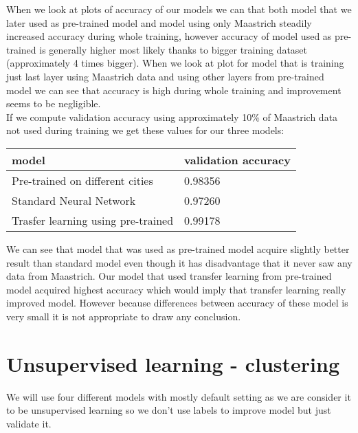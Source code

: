 \documentclass[a4paper]{article}
\begin{document}
	When we look at plots of accuracy of our models we can that both model that we later used as pre-trained model and model using only Maastrich steadily increased accuracy during whole training, however accuracy of model used as pre-trained is generally higher most likely thanks to bigger training dataset (approximately 4 times bigger). When we look at plot for model that is training just last layer using Maastrich data and using other layers from pre-trained model we can see that accuracy is high during whole training and improvement seems to be negligible.   
	\\
	
	If we compute validation accuracy using approximately 10\% of Maastrich data not used during training we get these values for our three models:
	\begin{table}[!h]
		\begin{tabular}{|l|l|}
			\hline
			model &  validation accuracy  \\ \hline
			Pre-trained on different cities  & 0.98356 \\ \hline
			Standard Neural Network & 0.97260 \\ \hline
			Trasfer learning using pre-trained &  0.99178 \\ \hline
		\end{tabular}
	\end{table} 

	We can see that model that was used as pre-trained model acquire slightly better result than standard model even though it has disadvantage that it never saw any data from Maastrich. Our model that used transfer learning from pre-trained model acquired highest accuracy which would imply that transfer learning really improved model. However because differences between accuracy of these model is very small it is not appropriate to draw any conclusion.
	
	
	\section{Unsupervised learning - clustering}
	
	We will use four different models with mostly default setting as we are consider it to be unsupervised learning so we don't use labels to improve model but just validate it.
	\\
	
\end{document}
